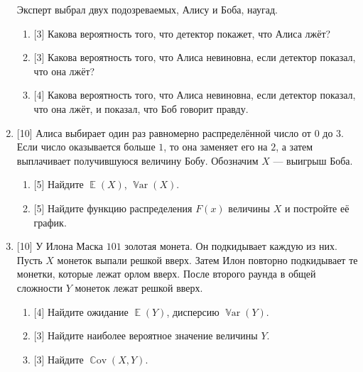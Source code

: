 \documentclass[12pt]{article}
\DeclareMathOperator{\Cov}{\mathbb{C}ov}
\DeclareMathOperator{\Var}{\mathbb{V}ar}
\DeclareMathOperator{\E}{\mathbb{E}}
\begin{document}
\begin{enumerate}
    Эксперт выбрал двух подозреваемых, Алису и Боба, наугад. 
    \begin{enumerate}
        \item {[3]} Какова вероятность того, что детектор покажет, что Алиса лжёт?
        \item {[3]} Какова вероятность того, что Алиса невиновна, если детектор показал, что она лжёт?
        \item {[4]} Какова вероятность того, что Алиса невиновна, если детектор показал, что она лжёт, и показал, что Боб говорит правду.
    \end{enumerate}


    \item {[10]} Алиса выбирает один раз равномерно распределённой число от $0$ до $3$. 
    Если число оказывается больше $1$, то она заменяет его на $2$, а затем выплачивает получившуюся величину Бобу.
    Обозначим $X$ — выигрыш Боба.
    \begin{enumerate}
        \item {[5]} Найдите $\E(X)$, $\Var(X)$.
        \item {[5]} Найдите функцию распределения $F(x)$ величины $X$ и постройте её график.
    \end{enumerate}


    \item {[10]} У Илона Маска $101$ золотая монета. 
    Он подкидывает каждую из них. 
    Пусть $X$ монеток выпали решкой вверх. 
    Затем Илон повторно подкидывает те монетки, которые лежат орлом вверх. 
    После второго раунда в общей сложности $Y$ монеток лежат решкой вверх.

    \begin{enumerate}
        \item {[4]} Найдите ожидание $\E(Y)$, дисперсию $\Var(Y)$.
        \item {[3]} Найдите наиболее вероятное значение величины $Y$.
        \item {[3]} Найдите $\Cov(X, Y)$.
    \end{enumerate}
\end{enumerate}
\end{document}
